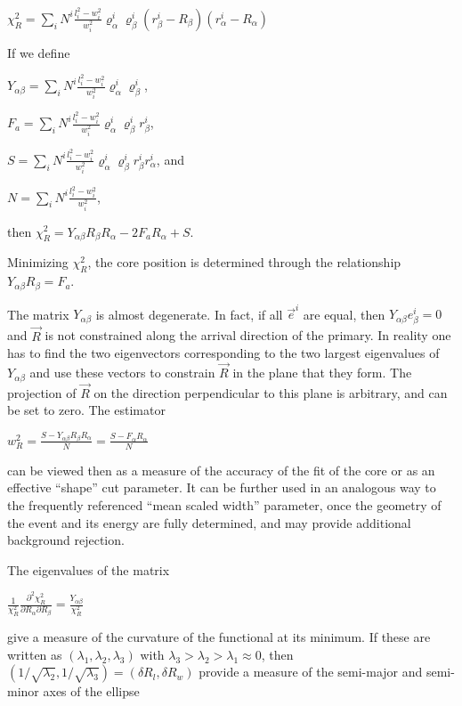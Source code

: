 \documentclass[letterpaper]{article}
\begin{document}
$\displaystyle
\chi_{R}^{2}=\sum\limits_{i}N^{i}\frac{l_{i}^{2}-w_{i}^{2}}{w_{i}^{2}}
\varrho_{\alpha}^{i}\varrho_{\beta}^{i}(r_{\beta}^{i}-R_{\beta
})(r_{\alpha}^{i}-R_{\alpha})$

If we define

$\displaystyle Y_{\alpha\beta}
=\sum\limits_{i}N^{i}\frac{l_{i}^{2}-w_{i}^{2}}{w_{i}^{2}}
\varrho_{\alpha}^{i}\varrho_{\beta}^{i}$,

$\displaystyle
F_{a}=\sum\limits_{i}N^{i}\frac{l_{i}^{2}-w_{i}^{2}}{w_{i}^{2}}
\varrho_{\alpha}^{i}\varrho_{\beta}^{i}r_{\beta}^{i}$,

$\displaystyle
S=\sum\limits_{i}N^{i}\frac{l_{i}^{2}-w_{i}^{2}}{w_{i}^{2}}
\varrho_{\alpha}^{i}\varrho_{\beta}^{i}r_{\beta}^{i}r_{\alpha}^{i}$, and

$\displaystyle N=\sum\limits_{i}N^{i}\frac{l_{i}^{2}-w_{i}^{2}}{w_{i}^{2}}$,

then $\chi_{R}^{2}=Y_{\alpha \beta }R_{\beta }R_{\alpha}-2F_{a}R_{\alpha }+S$.

Minimizing $\chi_{R}^{2}$, the core position is determined through the
relationship $\displaystyle Y_{\alpha \beta }R_{\beta }=F_{a}$.

The matrix $Y_{\alpha\beta}$ is almost degenerate. In fact, if all
$\vec{e}^{i}$ are equal, then $Y_{\alpha\beta}e_{\beta}^{i}=0$ and
$\vec{R}$ is not constrained along the arrival direction of the
primary. In reality one has to find the two eigenvectors corresponding
to the two largest eigenvalues of $Y_{\alpha\beta}$ and use these
vectors to constrain $\vec{R}$ in the plane that they form. The
projection of $\vec{R}$ on the direction perpendicular to this plane
is arbitrary, and can be set to zero. The estimator

$\displaystyle w_{R}^{2}=\frac{S-Y_{\alpha\beta}R_{\beta}R_{\alpha}}{N}
=\frac{S-F_{\alpha}R_{\alpha}}{N}$

can be viewed then as a measure of the accuracy of the fit of the core
or as an effective ``shape'' cut parameter. It can be further used in
an analogous way to the frequently referenced ``mean scaled width''
parameter, once the geometry of the event and its energy are fully
determined, and may provide additional background rejection.

The eigenvalues of the matrix 

$\displaystyle \frac{1}{\chi_R^2}\frac{\partial^2\chi_R^2}
{\partial R_\alpha\partial R_\beta} = \frac{Y_{\alpha\beta}}{\chi_R^2}$

give a measure of the curvature of the functional at its minimum. If
these are written as $(\lambda_1, \lambda_2, \lambda_3)$ with
$\lambda_3>\lambda_2>\lambda_1 \approx 0$, then
$(1/\sqrt{\lambda_2},1/\sqrt{\lambda_3})=(\delta R_l, \delta R_w)$
provide a measure of the semi-major and semi-minor axes of the
ellipse 
\end{document}
